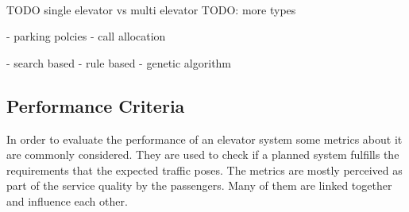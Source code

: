 \paragraph{}





TODO
single elevator  vs multi elevator
TODO: more types

\autocite[][pp.~3--4,10]{beers2015arrivals}
- parking polcies
- call allocation

\autocite[][pp.~3--6]{axelsson2013strategies}
- search based
- rule based
- genetic algorithm




\subsection{Performance Criteria}
\label{sota:sec:perf}

In order to evaluate the performance of an elevator system some metrics about it are commonly considered.
They are used to check if a planned system fulfills the requirements that the expected traffic poses. 
The metrics are mostly perceived as part of the service quality by the passengers.
Many of them are linked together and influence each other.


